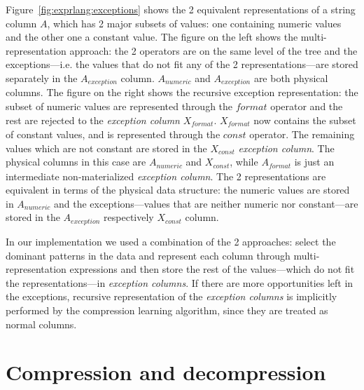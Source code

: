 Figure~\ref{fig:exprlang:exceptions} shows the 2 equivalent representations of a string column \(A\), which has 2 major subsets of values: one containing numeric values and the other one a constant value. The figure on the left shows the multi-representation approach: the 2 operators are on the same level of the tree and the exceptions---i.e. the values that do not fit any of the 2 representations---are stored separately in the \(A_{\mathit{exception}}\) column. \(A_{\mathit{numeric}}\) and \(A_{\mathit{exception}}\) are both physical columns. The figure on the right shows the recursive exception representation: the subset of numeric values are represented through the \(format\) operator and the rest are rejected to the \textit{exception column} \(X_{\mathit{format}}\). \(X_{\mathit{format}}\) now contains the subset of constant values, and is represented through the \(const\) operator. The remaining values which are not constant are stored in the \(X_{\mathit{const}}\) \textit{exception column}. The physical columns in this case are \(A_{\mathit{numeric}}\) and \(X_{\mathit{const}}\), while \(A_{\mathit{format}}\) is just an intermediate non-materialized \textit{exception column}. The 2 representations are equivalent in terms of the physical data structure: the numeric values are stored in \(A_{\mathit{numeric}}\) and the exceptions---values that are neither numeric nor constant---are stored in the \(A_{\mathit{exception}}\) respectively \(X_{\mathit{const}}\) column.

In our implementation we used a combination of the 2 approaches: select the dominant patterns in the data and represent each column through multi-representation expressions and then store the rest of the values---which do not fit the representations---in \textit{exception columns}. If there are more opportunities left in the exceptions, recursive representation of the \textit{exception columns} is implicitly performed by the compression learning algorithm, since they are treated as normal columns.

\section{Compression and decompression}
\label{sec:exprlang:compdecomp}

